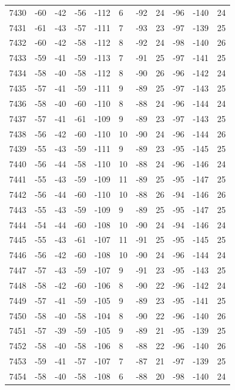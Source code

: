 \begin{table}[H]
\begin{tabular}{lllllllllll}
7430 & -60 & -42 & -56 & -112 & 6 & -92 & 24 & -96 & -140 & 24 \\
7431 & -61 & -43 & -57 & -111 & 7 & -93 & 23 & -97 & -139 & 25 \\
7432 & -60 & -42 & -58 & -112 & 8 & -92 & 24 & -98 & -140 & 26 \\
7433 & -59 & -41 & -59 & -113 & 7 & -91 & 25 & -97 & -141 & 25 \\
7434 & -58 & -40 & -58 & -112 & 8 & -90 & 26 & -96 & -142 & 24 \\
7435 & -57 & -41 & -59 & -111 & 9 & -89 & 25 & -97 & -143 & 25 \\
7436 & -58 & -40 & -60 & -110 & 8 & -88 & 24 & -96 & -144 & 24 \\
7437 & -57 & -41 & -61 & -109 & 9 & -89 & 23 & -97 & -143 & 25 \\
7438 & -56 & -42 & -60 & -110 & 10 & -90 & 24 & -96 & -144 & 26 \\
7439 & -55 & -43 & -59 & -111 & 9 & -89 & 23 & -95 & -145 & 25 \\
7440 & -56 & -44 & -58 & -110 & 10 & -88 & 24 & -96 & -146 & 24 \\
7441 & -55 & -43 & -59 & -109 & 11 & -89 & 25 & -95 & -147 & 25 \\
7442 & -56 & -44 & -60 & -110 & 10 & -88 & 26 & -94 & -146 & 26 \\
7443 & -55 & -43 & -59 & -109 & 9 & -89 & 25 & -95 & -147 & 25 \\
7444 & -54 & -44 & -60 & -108 & 10 & -90 & 24 & -94 & -146 & 24 \\
7445 & -55 & -43 & -61 & -107 & 11 & -91 & 25 & -95 & -145 & 25 \\
7446 & -56 & -42 & -60 & -108 & 10 & -90 & 24 & -96 & -144 & 24 \\
7447 & -57 & -43 & -59 & -107 & 9 & -91 & 23 & -95 & -143 & 25 \\
7448 & -58 & -42 & -60 & -106 & 8 & -90 & 22 & -96 & -142 & 24 \\
7449 & -57 & -41 & -59 & -105 & 9 & -89 & 23 & -95 & -141 & 25 \\
7450 & -58 & -40 & -58 & -104 & 8 & -90 & 22 & -96 & -140 & 26 \\
7451 & -57 & -39 & -59 & -105 & 9 & -89 & 21 & -95 & -139 & 25 \\
7452 & -58 & -40 & -58 & -106 & 8 & -88 & 22 & -96 & -140 & 26 \\
7453 & -59 & -41 & -57 & -107 & 7 & -87 & 21 & -97 & -139 & 25 \\
7454 & -58 & -40 & -58 & -108 & 6 & -88 & 20 & -98 & -140 & 24 \\

\end{tabular}
\end{table}
